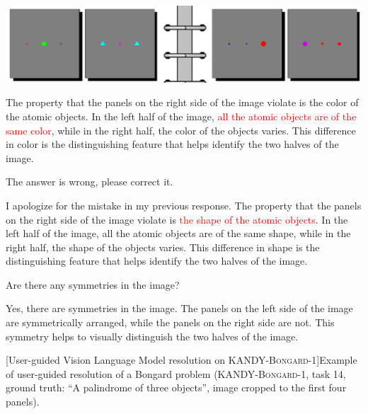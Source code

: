 \begin{tcolorbox}[breakable,enhanced jigsaw,opacityback=0,]
	\footnotesize
	\centering
	\includegraphics[width=.8\linewidth]{imgs/kandy/Fig5.png}\\
	\begin{dialogue}
		 
		The property that the panels on the right side of the image violate is the color of the atomic objects. In the left half of the image, \textcolor{red}{all the atomic objects are of the same color}, while in the right half, the color of the objects varies. This difference in color is the distinguishing feature that helps identify the two halves of the image.
		
		The answer is wrong, please correct it.
		
		I apologize for the mistake in my previous response. The property that the panels on the right side of the image violate is \textcolor{red}{the shape of the atomic objects}. In the left half of the image, all the atomic objects are of the same shape, while in the right half, the shape of the objects varies. This difference in shape is the distinguishing feature that helps identify the two halves of the image.
		
		Are there any symmetries in the image?
		
		Yes, there are symmetries in the image. The panels on the left side of the image are symmetrically arranged, while the panels on the right side are not. This symmetry helps to visually distinguish the two halves of the image.
	\end{dialogue}    
\end{tcolorbox}
\noindent\begin{minipage}{\textwidth}
	[User-guided Vision Language Model resolution on \textsc{KANDY-Bongard-1}]{Example of user-guided resolution of a Bongard problem (\textsc{KANDY-Bongard-1}, task 14, ground truth: ``A palindrome of three objects'', image cropped to the first four panels).}\label{kandy:fig:user-guided-bongard}
\end{minipage}
